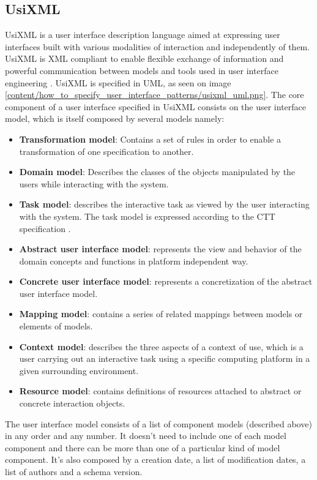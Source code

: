 \subsection{UsiXML}
UsiXML is a user interface description language aimed at expressing user interfaces built with various modalities of interaction and independently of them. UsiXML is XML compliant to enable flexible exchange of information and powerful communication between models and tools used in user interface engineering \cite{UsiXML_USer_Interface_eXtensible_Markup_Language}. UsiXML is specified in UML, as seen on image \ref{content/how_to_specify_user_interface_patterns/usixml_uml.png}.
The core component of a user interface specified in UsiXML consists on the user interface model, which is itself composed by several models namely:
\begin{itemize}
\item \textbf{Transformation model}:  Contains a set of rules in order to enable a transformation of one specification to another.
\item \textbf{Domain model}: Describes the classes of the objects manipulated by the users while interacting with the system.
\item \textbf{Task model}: describes the interactive task as viewed by the user interacting with the system. The task model is expressed according to the CTT specification \cite{ConcurTaskTrees_A_Diagrammatic_Notation_for_Specifying_Task_Models}.
\item \textbf{Abstract user interface model}: represents the view and behavior of the domain concepts and functions in platform independent way.
\item \textbf{Concrete user interface model}: represents a concretization of the abstract user interface model.
\item \textbf{Mapping model}: contains a series of related mappings between models or elements of models.
\item \textbf{Context model}: describes the three aspects of a context of use, which is a user carrying out an interactive task using a specific computing platform in a given surrounding environment.
\item \textbf{Resource model}: contains definitions of resources attached to abstract or concrete interaction objects.
\end{itemize}

The user interface model consists of a list of component models (described above) in any order and any number. It doesn't need to include one of each model component and there can be more than one of a particular kind of model component. It's also composed by a creation date, a list of modification dates, a list of authors and a schema version.

